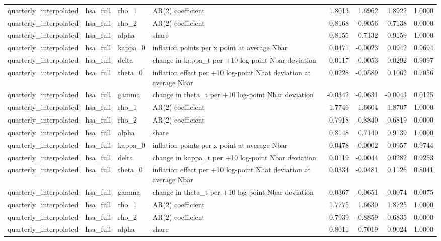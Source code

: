 \begin{tabular}{llllrrrr}
quarterly\_interpolated & hsa\_full & rho\_1 & AR(2) coefficient & 1.8013 & 1.6962 & 1.8922 & 1.0000 \\
quarterly\_interpolated & hsa\_full & rho\_2 & AR(2) coefficient & -0.8168 & -0.9056 & -0.7138 & 0.0000 \\
quarterly\_interpolated & hsa\_full & alpha & share & 0.8155 & 0.7132 & 0.9159 & 1.0000 \\
quarterly\_interpolated & hsa\_full & kappa\_0 & inflation points per x point at average Nbar & 0.0471 & -0.0023 & 0.0942 & 0.9694 \\
quarterly\_interpolated & hsa\_full & delta & change in kappa\_t per +10 log-point Nbar deviation & 0.0117 & -0.0053 & 0.0292 & 0.9097 \\
quarterly\_interpolated & hsa\_full & theta\_0 & inflation effect per +10 log-point Nhat deviation at average Nbar & 0.0228 & -0.0589 & 0.1062 & 0.7056 \\
quarterly\_interpolated & hsa\_full & gamma & change in theta\_t per +10 log-point Nbar deviation & -0.0342 & -0.0631 & -0.0043 & 0.0125 \\
quarterly\_interpolated & hsa\_full & rho\_1 & AR(2) coefficient & 1.7746 & 1.6604 & 1.8707 & 1.0000 \\
quarterly\_interpolated & hsa\_full & rho\_2 & AR(2) coefficient & -0.7918 & -0.8840 & -0.6819 & 0.0000 \\
quarterly\_interpolated & hsa\_full & alpha & share & 0.8148 & 0.7140 & 0.9139 & 1.0000 \\
quarterly\_interpolated & hsa\_full & kappa\_0 & inflation points per x point at average Nbar & 0.0478 & -0.0002 & 0.0957 & 0.9744 \\
quarterly\_interpolated & hsa\_full & delta & change in kappa\_t per +10 log-point Nbar deviation & 0.0119 & -0.0044 & 0.0282 & 0.9253 \\
quarterly\_interpolated & hsa\_full & theta\_0 & inflation effect per +10 log-point Nhat deviation at average Nbar & 0.0334 & -0.0481 & 0.1126 & 0.8041 \\
quarterly\_interpolated & hsa\_full & gamma & change in theta\_t per +10 log-point Nbar deviation & -0.0367 & -0.0651 & -0.0074 & 0.0075 \\
quarterly\_interpolated & hsa\_full & rho\_1 & AR(2) coefficient & 1.7775 & 1.6630 & 1.8725 & 1.0000 \\
quarterly\_interpolated & hsa\_full & rho\_2 & AR(2) coefficient & -0.7939 & -0.8859 & -0.6835 & 0.0000 \\
quarterly\_interpolated & hsa\_full & alpha & share & 0.8011 & 0.7019 & 0.9024 & 1.0000 \\

\end{tabular}
